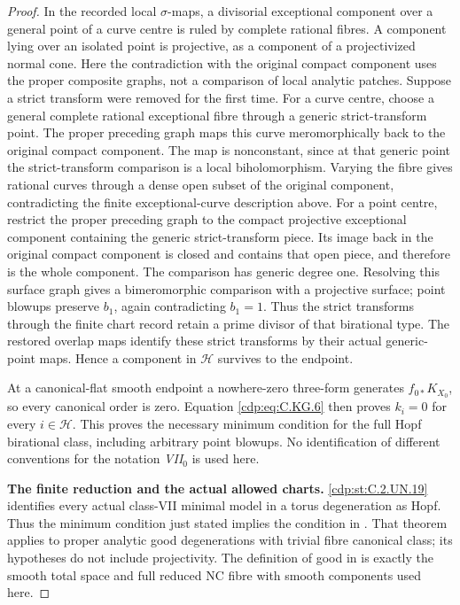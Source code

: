 \begin{proof}
In the recorded local $\sigma$-maps, a divisorial
exceptional component over a general point of a
curve centre is ruled by complete rational
fibres. A component lying over an isolated
point is projective, as a component of a
projectivized normal cone. Here the contradiction
with the original compact component uses the
proper composite graphs, not a comparison of
local analytic patches. Suppose a strict
transform were removed for the first time.
For a curve centre, choose a general complete
rational exceptional fibre through a generic
strict-transform point. The proper preceding
graph maps this curve meromorphically back to
the original compact component. The map is
nonconstant, since at that generic point the
strict-transform comparison is a local
biholomorphism. Varying the fibre gives
rational curves through a dense open subset
of the original component, contradicting the
finite exceptional-curve description above.
For a point centre, restrict the proper
preceding graph to the compact projective
exceptional component containing the generic
strict-transform piece. Its image back in
the original compact component is closed
and contains that open piece, and therefore
is the whole component. The comparison has
generic degree one. Resolving this surface
graph gives a bimeromorphic comparison with
a projective surface; point blowups preserve
$b_1$, again contradicting $b_1=1$.
Thus the strict transforms through the
finite chart record retain a prime divisor
of that birational type. The restored
overlap maps identify these strict transforms
by their actual generic-point maps. Hence a
component in $\mathcal H$ survives to the
endpoint.

At a canonical-flat smooth endpoint a nowhere-zero
three-form generates $f_{0*}K_{X_0}$, so every
canonical order is zero. Equation \eqref{cdp:eq:C.KG.6} then
proves $k_i=0$ for every $i\in\mathcal H$.
This proves the necessary minimum condition for
the full Hopf birational class, including
arbitrary point blowups. No identification of
different conventions for the notation
\emph{VII$_0$} is used here.

\par\medskip\noindent\textbf{The finite reduction and the actual allowed charts.}
\ref{cdp:st:C.2.UN.19} identifies every actual class-VII minimal
model in a torus degeneration as Hopf. Thus the
minimum condition just stated implies the
condition in \cite[Theorem~1']{Kulikov1981}.
That theorem applies to proper analytic good
degenerations with trivial fibre canonical
class; its hypotheses do not include
projectivity. The definition of good in
\cite[p.958]{Kulikov1977} is exactly the smooth
total space and full reduced NC fibre with
smooth components used here.


\end{proof}

